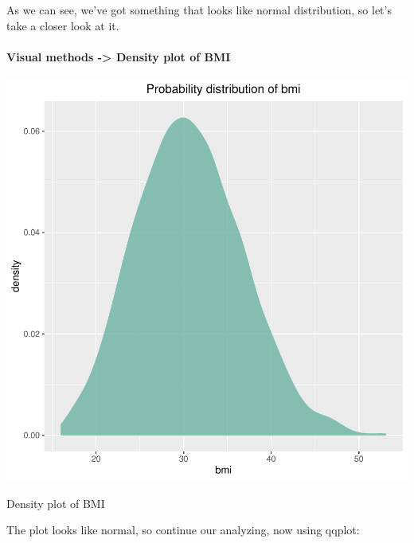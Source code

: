 \documentclass{article}
\begin{document}
As we can see, we've got something that looks like normal distribution,
so let's take a closer look at it.

\paragraph{Visual methods -> Density plot of BMI\newline}

\begin{centerfig}
\begin{Schunk}
\end{Schunk}
\includegraphics{Untitled-023}
\caption{Density plot of BMI}
\end{centerfig}

The plot looks like normal, so continue our analyzing, now using qqplot:
\end{document}
